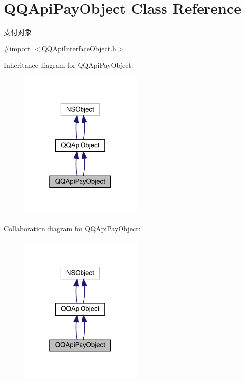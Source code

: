 \hypertarget{interface_q_q_api_pay_object}{}\section{Q\+Q\+Api\+Pay\+Object Class Reference}
\label{interface_q_q_api_pay_object}


支付对象  




{\ttfamily \#import $<$Q\+Q\+Api\+Interface\+Object.\+h$>$}



Inheritance diagram for Q\+Q\+Api\+Pay\+Object\+:\nopagebreak
\begin{figure}[H]
\begin{center}
\leavevmode
\includegraphics[width=172pt]{interface_q_q_api_pay_object__inherit__graph}
\end{center}
\end{figure}


Collaboration diagram for Q\+Q\+Api\+Pay\+Object\+:\nopagebreak
\begin{figure}[H]
\begin{center}
\leavevmode
\includegraphics[width=172pt]{interface_q_q_api_pay_object__coll__graph}
\end{center}
\end{figure}
